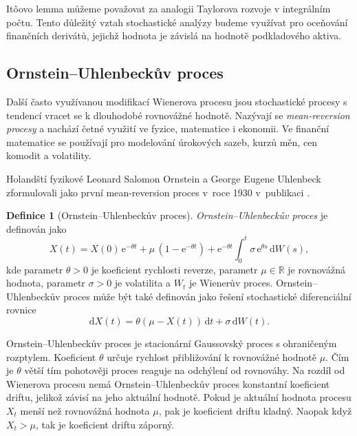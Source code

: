\documentclass[a4paper,12pt]{report}
\theoremstyle{definition} \newtheorem{definice}[veta]{Definice}
\theoremstyle{remark}
\begin{document}
It\^oovo lemma můžeme považovat za analogii Taylorova rozvoje v integrálním počtu.
Tento důležitý vztah stochastické analýzy budeme využívat pro oceňování finančních derivátů, jejichž hodnota je závislá na hodnotě podkladového aktiva.


\subsection{Ornstein–Uhlenbeckův proces}\label{OU_kap}
Další často využívanou modifikací Wienerova procesu jsou stochastické procesy s tendencí vracet se k dlouhodobé rovnovážné hodnotě.
Nazývají se \textit{mean-reversion procesy} a nachází četné využití ve fyzice, matematice i ekonomii.
Ve finanční matematice se používají pro modelování úrokových sazeb, kurzů měn, cen komodit a volatility.

Holandští fyzikové Leonard Salomon Ornstein a George Eugene Uhlenbeck zformulovali jako první mean-reversion proces v~roce 1930 v~publikaci \cite{OrnsteinUhlenbeck1930}. %

\begin{definice}[Ornstein–Uhlenbeckův proces]
\textit{Ornstein–Uhlenbeckův proces} je definován jako
\begin{equation}\label{OUP}
X(t) = X(0)\,\mathrm{e}^{-\theta t} + \mu\,(1-\mathrm{e}^{-\theta t}) + \mathrm{e}^{-\theta t}\int_0^t \sigma\,\mathrm{e}^{\theta s}\,\mathrm{d}W(s),
\end{equation}
kde parametr $\theta>0$ je koeficient rychlosti reverze, parametr $\mu\in\mathbb{R}$ je rovnovážná hodnota, parametr $\sigma>0$ je volatilita a $W_t$ je Wienerův proces.
Ornstein–Uhlenbeckův proces může být také definován jako řešení stochastické diferenciální rovnice
\begin{equation}\label{SDE_OUP}
\mathrm{d}X(t) = \theta(\mu-X(t))\,\mathrm{d}t + \sigma\,\mathrm{d}W(t).
\end{equation}
\end{definice}

Ornstein–Uhlenbeckův proces je stacionární Gaussovský proces s ohraničeným rozptylem. 
Koeficient $\theta$ určuje rychlost přibližování k rovnovážné hodnotě $\mu$. %
Čím je $\theta$ větší tím pohotověji proces reaguje na odchýlení od rovnováhy. 
Na rozdíl od Wienerova procesu nemá Ornstein–Uhlenbeckův proces konstantní koeficient driftu, jelikož závisí na jeho aktuální hodnotě.
Pokud je aktuální hodnota procesu $X_t$ menší než rovnovážná hodnota $\mu$, pak je koeficient driftu kladný.
Naopak když $X_t>\mu$, tak je koeficient driftu záporný.
\end{document}
